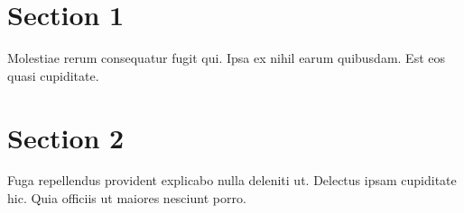 \documentclass{article}
\begin{document}
  \section{Section 1}
     Molestiae rerum consequatur fugit qui. Ipsa ex nihil earum quibusdam. \footnotesize Est eos quasi cupiditate. 
  \section{Section 2}
     Fuga repellendus provident explicabo nulla deleniti ut. Delectus ipsam cupiditate hic. Quia officiis ut maiores nesciunt porro.
\end{document}
